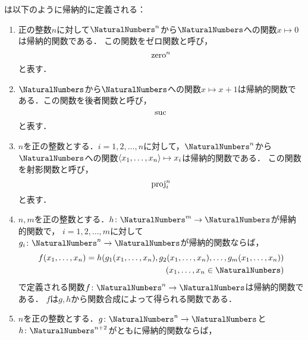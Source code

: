 \begin{Def} \label{Def:recursivefunction}
	は以下のように帰納的に定義される：
	\begin{enumerate}
		\item 正の整数\(n\)に対して\(\NaturalNumbers^n\)から\(\NaturalNumbers\)への関数\(x \mapsto 0\)は帰納的関数である．
		      この関数をゼロ関数と呼び，
		      \begin{equation}
			      \operatorname{zero}^n
			      \label{eq:zerofunction}
		      \end{equation}
		      と表す．
		\item \(\NaturalNumbers\)から\(\NaturalNumbers\)への関数\(x \mapsto x + 1\)は帰納的関数である．この関数を後者関数と呼び，
		      \begin{equation}
			      \operatorname{suc}
			      \label{eq:sucfunction}
		      \end{equation}
		      と表す．
		\item \(n\)を正の整数とする．\(i=1,2,\dots, n\)に対して，\(\NaturalNumbers^n\)から\(\NaturalNumbers\)への関数\(\langle x_1, \dots, x_n \rangle \mapsto x_i\)は帰納的関数である．
		      この関数を射影関数と呼び，
		      \begin{equation}
			      \operatorname{proj}_i^n
		      \end{equation}
		      と表す．
		\item \(n,m\)を正の整数とする．\(h \colon \NaturalNumbers^m \to \NaturalNumbers\)が帰納的関数で，
		      \(i = 1,2,\dots,m\)に対して\(g_i \colon \NaturalNumbers^n \to \NaturalNumbers\)が帰納的関数ならば，
		      \begin{align*}
			      \apply{f}{x_1, \dots, x_n} = \apply{h}{
				      \apply{g_1}{x_1, \dots, x_n},
				      \apply{g_2}{x_1, \dots, x_n},
				      \dots,
				      \apply{g_m}{x_1, \dots, x_n}
			      } \\
			      \text{(\(x_1, \dots, x_n \in \NaturalNumbers\))}
		      \end{align*}
		      で定義される関数\(f \colon \NaturalNumbers^n \to \NaturalNumbers\)は帰納的関数である．
		      \(f\)は\(g, h\)から関数合成によって得られる関数である．
		\item \(n\)を正の整数とする．\(g \colon \NaturalNumbers^n \to \NaturalNumbers\)と\(h \colon \NaturalNumbers^{n+2}\)がともに帰納的関数ならば，

\end{enumerate}
\end{Def}
